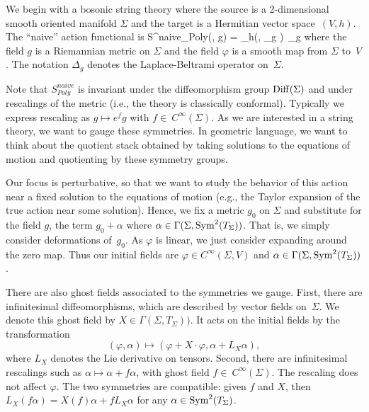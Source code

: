 We begin with a bosonic string theory where the source is a 2-dimensional smooth oriented manifold $\Sigma$ and the target is a Hermitian vector space~$(V,h)$. 
The ``naive'' action functional is
\ben
S^{naive}_{Poly}(\varphi, g) = \int_\Sigma h(\varphi, \Delta_{g} \varphi)\, \dvol_g
\een
where the field $g$ is a Riemannian metric on $\Sigma$ and the field $\varphi$ is a smooth map from $\Sigma$ to~$V$.
The notation $\Delta_g$ denotes the Laplace-Beltrami operator on~$\Sigma$. 

Note that $S^{naive}_{Poly}$ is invariant under the diffeomorphism group ${\rm Diff}(\Sigma)$ and under rescalings of the metric
(i.e., the theory is classically conformal).
Typically we express rescaling as $g \mapsto e^{f} g$ with $f \in~C^\infty(\Sigma)$.
As we are interested in a string theory, we want to gauge these symmetries.
In geometric language, we want to think about the quotient stack 
obtained by taking solutions to the equations of motion and quotienting by these symmetry groups.


Our focus is perturbative, so that we want to study the behavior of this action near a fixed solution to the equations of motion
(e.g., the Taylor expansion of the true action near some solution).
Hence, we fix a metric $g_0$ on $\Sigma$ and substitute for the field $g$,
the term $g_0+\alpha$ where $\alpha \in \Gamma(\Sigma,{\rm Sym}^2(T_\Sigma))$.
That is, we simply consider deformations of~$g_0$.
As $\varphi$ is linear, we just consider expanding around the zero map.
Thus our initial fields are $\varphi \in C^\infty(\Sigma,V)$ and $\alpha \in \Gamma(\Sigma,{\rm Sym}^2(T_\Sigma))$.

There are also ghost fields associated to the symmetries we gauge.
First, there are infinitesimal diffeomorphisms,  which are described by vector fields on~$\Sigma$.
We denote this ghost field by $X \in \Gamma(\Sigma,T_\Sigma))$.
It acts on the initial fields by the transformation 
\[
(\varphi,\alpha) \mapsto (\varphi + X \cdot \varphi, \alpha + L_X \alpha), 
\]
where $L_X$ denotes the Lie derivative on tensors.
Second, there are infinitesimal rescalings such as $\alpha \mapsto \alpha + f \alpha$, 
with ghost field $f \in~C^\infty(\Sigma)$.
The rescaling does not affect $\varphi$.
The two symmetries are compatible: 
given $f$ and $X$, then $L_{X} (f \alpha) = X(f) \alpha + f L_X \alpha$ for any $\alpha \in {\rm Sym}^2(T_\Sigma)$.

